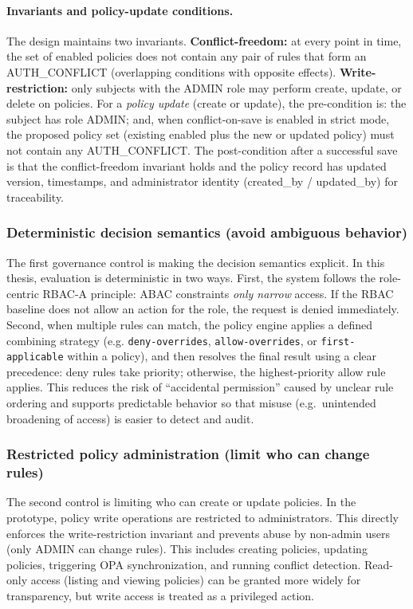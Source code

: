 \paragraph{Invariants and policy-update conditions.}
The design maintains two invariants. \textbf{Conflict-freedom:} at every point in time, the set of enabled policies does not contain any pair of rules that form an AUTH\_CONFLICT (overlapping conditions with opposite effects). \textbf{Write-restriction:} only subjects with the ADMIN role may perform create, update, or delete on policies. For a \emph{policy update} (create or update), the pre-condition is: the subject has role ADMIN; and, when conflict-on-save is enabled in strict mode, the proposed policy set (existing enabled plus the new or updated policy) must not contain any AUTH\_CONFLICT. The post-condition after a successful save is that the conflict-freedom invariant holds and the policy record has updated version, timestamps, and administrator identity (created\_by / updated\_by) for traceability.
\vspace{0.5cm}

\subsubsection*{Deterministic decision semantics (avoid ambiguous behavior)}
The first governance control is making the decision semantics explicit. In this thesis, evaluation is deterministic in two ways. First, the system follows the role-centric RBAC-A principle: ABAC constraints \emph{only narrow} access. If the RBAC baseline does not allow an action for the role, the request is denied immediately. Second, when multiple rules can match, the policy engine applies a defined combining strategy (e.g. \texttt{deny-overrides}, \texttt{allow-overrides}, or \texttt{first-applicable} within a policy), and then resolves the final result using a clear precedence: deny rules take priority; otherwise, the highest-priority allow rule applies. This reduces the risk of ``accidental permission'' caused by unclear rule ordering and supports predictable behavior so that misuse (e.g.\ unintended broadening of access) is easier to detect and audit.
\vspace{0.5cm}

\subsubsection*{Restricted policy administration (limit who can change rules)}
The second control is limiting who can create or update policies. In the prototype, policy write operations are restricted to administrators. This directly enforces the write-restriction invariant and prevents abuse by non-admin users (only ADMIN can change rules). This includes creating policies, updating policies, triggering OPA synchronization, and running conflict detection. Read-only access (listing and viewing policies) can be granted more widely for transparency, but write access is treated as a privileged action.
\vspace{0.5cm}

